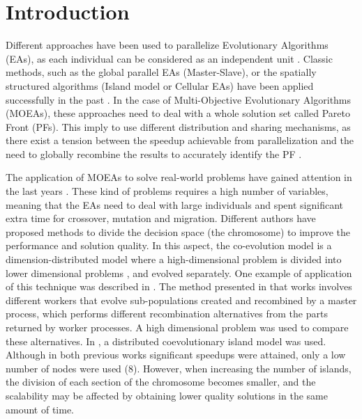 \documentclass[Crown,sagev,times,doublespace]{sagej}
\begin{document}

\maketitle

\section{Introduction}

Different approaches have been used to parallelize Evolutionary Algorithms (EAs), as each individual can be considered as an independent unit \citep{Alba13parallel}. Classic methods, such as the global parallel EAs (Master-Slave), or the spatially structured algorithms (Island model or Cellular EAs) have been applied successfully in the past \citep{Folino03cellular,Alba02Parallelism}.  In the case of Multi-Objective Evolutionary Algorithms (MOEAs), these approaches \citep{Luna15Survey} need to deal with a whole solution set called Pareto Front (PFs). This imply to use different distribution and sharing mechanisms, as there exist a tension between the speedup achievable from parallelization and the need to globally recombine the results to accurately identify the PF \citep{Branke04Parallelizingcone}.


The application of MOEAs to solve real-world problems have gained attention in the last years \citep{Luna15Survey,Mukhopadhyay14Survey,Chavez15MO,Hidalgo16residualstress}. These kind of problems requires a high number of variables, meaning that the EAs need to deal with large individuals and spent significant extra time for crossover, mutation and migration. Different authors have proposed methods to divide the decision space (the chromosome) to improve the performance and solution quality. In this aspect, the co-evolution model is a dimension-distributed model where a high-dimensional problem is divided into lower dimensional problems \citep{Gong15models,Tonda12cooperative}, and evolved separately. One example of application of this technique was described in \citep{Kimovski15Parallel}. The method presented in that works involves different workers that evolve sub-populations created and recombined by a master process, which performs different recombination alternatives from the parts returned by worker processes. A high dimensional problem was used to compare these
alternatives. In \citep{Dorronsoro13superlinear}, a distributed coevolutionary island model was used.  Although in both previous works significant speedups were attained, only a low number of nodes were used (8). However, when increasing the number of islands, the division of each section of the chromosome becomes smaller, and the scalability may be affected by obtaining lower quality solutions in the same amount of time.
\end{document}
